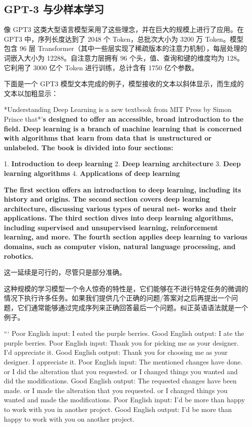 \subsection{GPT-3 与少样本学习}
像 GPT3 这类大型语言模型采用了这些理念，并在巨大的规模上进行了应用。在 GPT3 中，序列长度达到了 2048 个 Token，总批次大小为 3200 万 Token。模型包含 96 层 Transformer（其中一些层实现了稀疏版本的注意力机制），每层处理的词嵌入大小为 12288。自注意力层拥有 96 个头，值、查询和键的维度均为 128。它利用了 3000 亿个 Token 进行训练，总计含有 1750 亿个参数。

下面是一个 GPT3 模型文本完成的例子，模型接收的文本以斜体显示，而生成的文本以加粗显示：

*Understanding Deep Learning is a new textbook from MIT Press by Simon Prince that*’\textbf{s designed to offer an accessible, broad introduction to the field. Deep learning is a branch of machine learning that is concerned with algorithms that learn from data that is unstructured or unlabeled. The book is divided into four sections:}

1. \textbf{Introduction to deep learning} 
2. \textbf{Deep learning architecture}
3. \textbf{Deep learning algorithms}
4. \textbf{Applications of deep learning}

\textbf{The first section offers an introduction to deep learning, including its history and origins. The second section covers deep learning architecture, discussing various types of neural net- works and their applications. The third section dives into deep learning algorithms, including supervised and unsupervised learning, reinforcement learning, and more. The fourth section applies deep learning to various domains, such as computer vision, natural language processing, and robotics.}


这一延续是可行的，尽管只是部分准确。

这种规模的学习模型一个令人惊奇的特性是，它们能够在不进行特定任务的微调的情况下执行许多任务。如果我们提供几个正确的问题/答案对之后再提出一个问题，它们通常能够通过完成序列来正确回答最后一个问题。纠正英语语法就是一个例子。

```
Poor English input: I eated the purple berries.  
Good English output: I ate the purple berries.  
Poor English input: Thank you for picking me as your designer. I’d appreciate it.  
Good English output: Thank you for choosing me as your designer. I appreciate it.  
Poor English input: The mentioned changes have done. or I did the alteration that you requested. or I changed things you wanted and did the modifications.  
Good English output: The requested changes have been made. or I made the alteration that you requested. or I changed things you wanted and made the modifications.  
Poor English input: I’d be more than happy to work with you in another project.  
Good English output: I’d be more than happy to work with you on another project.

